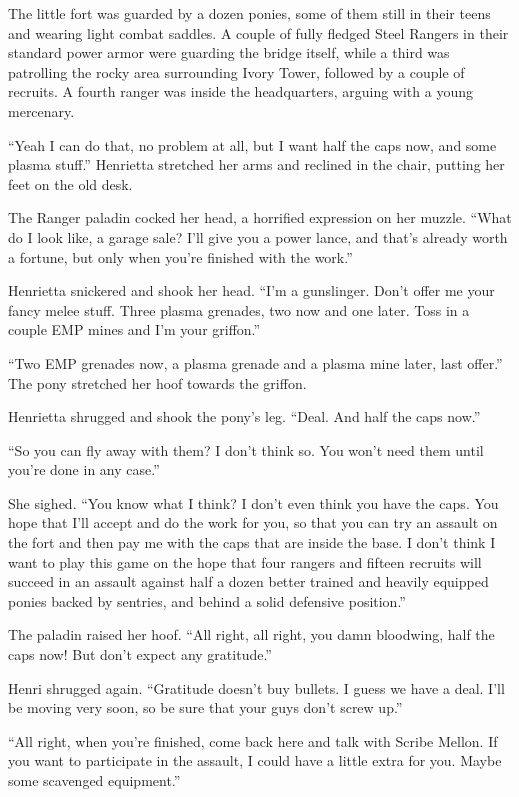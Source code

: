 The little fort was guarded by a dozen ponies, some of them still in their teens and wearing light combat saddles. A couple of fully fledged Steel Rangers in their standard power armor were guarding the bridge itself, while a third was patrolling the rocky area surrounding Ivory Tower, followed by a couple of recruits. A fourth ranger was inside the headquarters, arguing with a young mercenary.

``Yeah I can do that, no problem at all, but I want half the caps now, and some plasma stuff.'' Henrietta stretched her arms and reclined in the chair, putting her feet on the old desk.

The Ranger paladin cocked her head, a horrified expression on her muzzle. ``What do I look like, a garage sale? I'll give you a power lance, and that's already worth a fortune, but only when you're finished with the work.''

Henrietta snickered and shook her head. ``I'm a gunslinger. Don't offer me your fancy melee stuff. Three plasma grenades, two now and one later. Toss in a couple EMP mines and I'm your griffon.''

``Two EMP grenades now, a plasma grenade and a plasma mine later, last offer.'' The pony stretched her hoof towards the griffon.

Henrietta shrugged and shook the pony's leg. ``Deal. And half the caps now.''

``So you can fly away with them? I don't think so. You won't need them until you're done in any case.''

She sighed. ``You know what I think? I don't even think you have the caps. You hope that I'll accept and do the work for you, so that you can try an assault on the fort and then pay me with the caps that are inside the base. I don't think I want to play this game on the hope that four rangers and fifteen recruits will succeed in an assault against half a dozen better trained and heavily equipped ponies backed by sentries, and behind a solid defensive position.''

The paladin raised her hoof. ``All right, all right, you damn bloodwing, half the caps now! But don't expect any gratitude.''

Henri shrugged again. ``Gratitude doesn't buy bullets. I guess we have a deal. I'll be moving very soon, so be sure that your guys don't screw up.''

``All right, when you're finished, come back here and talk with Scribe Mellon. If you want to participate in the assault, I could have a little extra for you. Maybe some scavenged equipment.''

